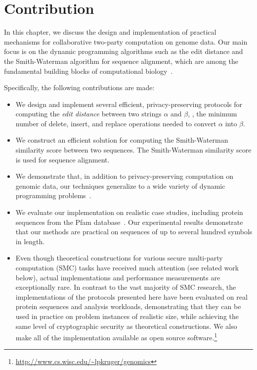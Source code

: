 \section{Contribution}
In this chapter, we discuss the design and implementation of
practical mechanisms for
collaborative two-party computation on genome data.  Our main focus is
on the dynamic programming algorithms such as the edit distance and
the Smith-Waterman algorithm for sequence alignment, which are among
the fundamental building blocks of computational biology~\cite[Chapter
11]{Gusfield}.

Specifically, the following contributions are made:

\begin{itemize}

\item 
We design and implement several efficient, privacy-preserving protocols
for computing the \emph{edit distance} between two strings $\alpha$
and $\beta$, \ie, the minimum number of {\sf delete}, {\sf insert},
and {\sf replace} operations needed to convert $\alpha$ into $\beta$.

\item
We construct an efficient solution for computing the Smith-Waterman~\cite{Smith-Waterman}
similarity score between two sequences. The Smith-Waterman similarity score is used for
sequence alignment.

\item
We demonstrate that, in addition to privacy-preserving computation on
genomic data, our techniques generalize to a wide variety of dynamic
programming problems~\cite[Chapter 15]{CLR}.

\item
We evaluate our implementation on realistic case studies, including
protein sequences from the Pfam database~\cite{pfam2002}.  Our experimental results
demonstrate that our methods are practical on sequences of up to several
hundred symbols in length.

\item
Even though theoretical constructions for various secure multi-party
computation (SMC) tasks have received much attention (see related
work below), actual implementations and performance measurements
are exceptionally rare.  In contrast to the vast majority of
SMC research, the implementations of the protocols presented here have been
evaluated on real protein sequences and analysis workloads, demonstrating
that they can be used in practice on problem instances of realistic size,
while achieving the same level of cryptographic security as theoretical
constructions.  We also make all of the implementation available as open source
software.\footnote{\url{http://www.cs.wisc.edu/~lpkruger/genomics}}

\end{itemize}

